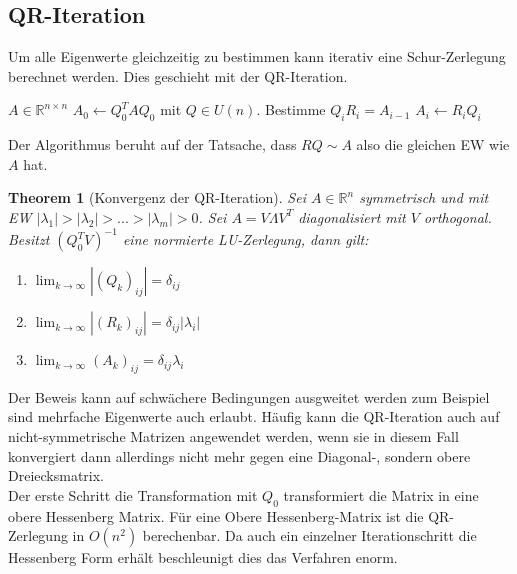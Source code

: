 \documentclass[10pt,a4paper]{article}
\newtheorem{theorem}{Theorem}
\begin{document}
	\subsection{QR-Iteration}
	Um alle Eigenwerte gleichzeitig zu bestimmen kann iterativ eine Schur-Zerlegung berechnet werden. Dies geschieht mit der QR-Iteration.
	\begin{algorithm}[H]
		\caption{QR-Iteration ohne Shift}
		\begin{algorithmic}
			\Require $A\in \mathbb{R}^{n \times n}$
			\State $A_0 \leftarrow Q_0^TAQ_0$ mit $Q\in U(n)$.
			\State Bestimme $Q_iR_i = A_{i-1}$
			\State $A_{i} \leftarrow R_iQ_i$
			\EndFor
		\end{algorithmic}
	\end{algorithm}
	Der Algorithmus beruht auf der Tatsache, dass $RQ \sim A$ also die gleichen EW wie $A$ hat.
	\begin{theorem}[Konvergenz der QR-Iteration]
		Sei $A\in \mathbb{R}^n$ symmetrisch und mit EW $|\lambda_1|> |\lambda_2| > ... > |\lambda_m| > 0$. Sei $A = V\Lambda V^T$ diagonalisiert mit $V$ orthogonal. Besitzt $(Q_0^TV)^{-1}$ eine normierte LU-Zerlegung, dann gilt:
		\begin{enumerate}
			\item $\lim_{k\to \infty} |(Q_k)_{ij}| = \delta_{ij}$
			\item $\lim_{k\to \infty} |(R_k)_{ij}| = \delta_{ij}|\lambda_i|$
			\item $\lim_{k\to \infty} (A_k)_{ij} = \delta_{ij}\lambda_i$
		\end{enumerate}
	\end{theorem}
	Der Beweis kann auf schwächere Bedingungen ausgweitet werden zum Beispiel sind mehrfache Eigenwerte auch erlaubt. Häufig kann die QR-Iteration auch auf nicht-symmetrische Matrizen angewendet werden, wenn sie in diesem Fall konvergiert dann allerdings nicht mehr gegen eine Diagonal-, sondern obere Dreiecksmatrix. \\
	Der erste Schritt die Transformation mit $Q_0$ transformiert die Matrix in eine obere Hessenberg Matrix. Für eine Obere Hessenberg-Matrix ist die QR-Zerlegung in $O(n^2)$ berechenbar. Da auch ein einzelner Iterationschritt die Hessenberg Form erhält beschleunigt dies das Verfahren enorm. 
\end{document}
